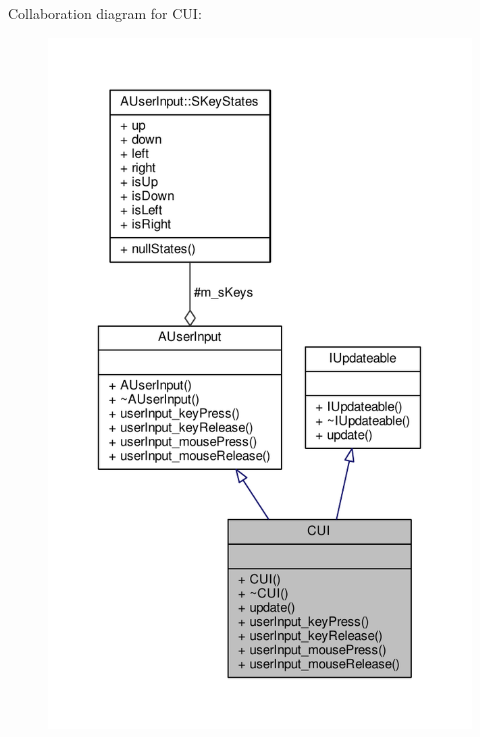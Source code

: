 Collaboration diagram for C\-U\-I\-:
\nopagebreak
\begin{figure}[H]
\begin{center}
\leavevmode
\includegraphics[width=331pt]{classCUI__coll__graph}
\end{center}
\end{figure}
